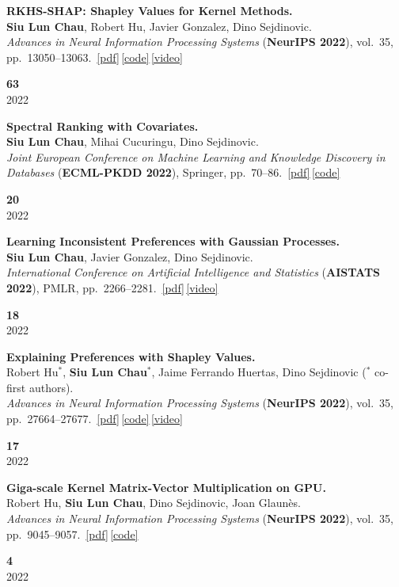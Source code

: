 \documentclass[11pt,a4paper]{article}
\newcommand{\me}{\textbf{Siu Lun Chau}}
\newcommand{\acro}[1]{\textcolor{accent}{\textbf{#1}}}
\newcommand{\venue}[2]{\textit{#1} (\acro{#2})}
\newcommand{\pdfb}[1]{\,\href{#1}{\textcolor{accent}{\small[pdf]}}}
\newcommand{\codeb}[1]{\,\href{#1}{\textcolor{accent}{\small[code]}}}
\newcommand{\videob}[1]{\,\href{#1}{\textcolor{accent}{\small[video]}}}
\newlength{\citecolwidth}\setlength{\citecolwidth}{2.4cm}
\newlength{\indexcolwidth}\setlength{\indexcolwidth}{3.2em}
\newcommand{\citebox}[2]{%
  {\color{citecol}\textbf{\large #1}}\\[1pt]
  {\color{mutedgrey}\small #2}%
}
\newcommand{\pubentry}[4]{%
  \noindent
  \makebox[\indexcolwidth][l]{\textbf{[#1]}}%
  \begin{minipage}[t]{\dimexpr\linewidth-\indexcolwidth-\citecolwidth-0.4em\relax}#2\end{minipage}%
  \hspace{0.4em}%
  \begin{minipage}[t]{\citecolwidth}\raggedleft\citebox{#3}{#4}\end{minipage}%
  \par\vspace{6pt}}
\begin{document}
\pubentry{C13}{%
\textbf{RKHS-SHAP: Shapley Values for Kernel Methods.}\\
\me, Robert Hu, Javier Gonzalez, Dino Sejdinovic.\\
\venue{Advances in Neural Information Processing Systems}{NeurIPS 2022}, vol.~35, pp.~13050--13063.%
\pdfb{https://proceedings.neurips.cc/paper_files/paper/2022/file/54bb63eaec676b87a2278a22b1bd02a2-Paper-Conference.pdf}\codeb{https://github.com/Chau999/RKHS-SHAP}\videob{https://www.youtube.com/watch?v=olmSYH-daG0}%
}{63}{2022}

\pubentry{C14}{%
\textbf{Spectral Ranking with Covariates.}\\
\me, Mihai Cucuringu, Dino Sejdinovic.\\
\venue{Joint European Conference on Machine Learning and Knowledge Discovery in Databases}{ECML-PKDD 2022}, Springer, pp.~70--86.%
\pdfb{https://arxiv.org/pdf/2005.04035.pdf}\codeb{https://github.com/Chau999/SpectralRankingWithCovariates}%
}{20}{2022}

\pubentry{C15}{%
\textbf{Learning Inconsistent Preferences with Gaussian Processes.}\\
\me, Javier Gonzalez, Dino Sejdinovic.\\
\venue{International Conference on Artificial Intelligence and Statistics}{AISTATS 2022}, PMLR, pp.~2266--2281.%
\pdfb{https://proceedings.mlr.press/v151/lun-chau22a/lun-chau22a.pdf}\videob{https://slideslive.at/38980474/learning-inconsistent-preferences-with-gaussian-processes}%
}{18}{2022}

\pubentry{C16}{%
\textbf{Explaining Preferences with Shapley Values.}\\
Robert Hu$^{*}$, \me$^{*}$, Jaime Ferrando Huertas, Dino Sejdinovic ($^{*}$ co-first authors).\\
\venue{Advances in Neural Information Processing Systems}{NeurIPS 2022}, vol.~35, pp.~27664--27677.%
\pdfb{https://proceedings.neurips.cc/paper_files/paper/2022/file/b1656d20067ca7c84a33785c4083a75e-Paper-Conference.pdf}\codeb{https://github.com/MrHuff/PREF-SHAP}\videob{https://slideslive.com/38992229/explaining-preferences-with-shapley-values}%
}{17}{2022}

\pubentry{C17}{%
\textbf{Giga-scale Kernel Matrix-Vector Multiplication on GPU.}\\
Robert Hu, \me, Dino Sejdinovic, Joan Glaun\`es.\\
\venue{Advances in Neural Information Processing Systems}{NeurIPS 2022}, vol.~35, pp.~9045--9057.%
\pdfb{https://arxiv.org/pdf/2202.01085.pdf}\codeb{https://anonymous.4open.science/r/F3M-7850/readme.md}%
}{4}{2022}
\end{document}
